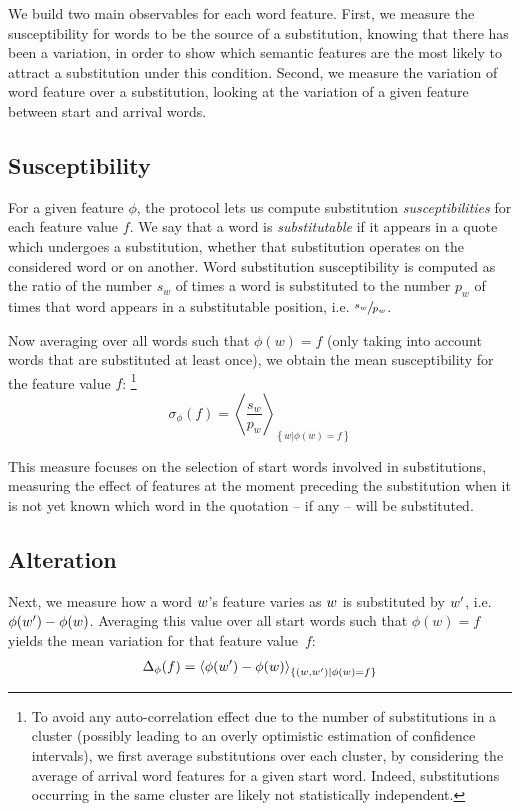 We build two main observables for each word feature.
First, we measure the susceptibility for words to be the source of a substitution, knowing that there has been a variation, in order to show which semantic features are the most likely to attract a substitution under this condition.
Second, we measure the variation of word feature over a substitution, looking at the variation of a given feature between start and arrival words.

\subsection{Susceptibility}

For a given feature $\phi$, the protocol lets us compute substitution \emph{susceptibilities} for each feature value $f$.
We say that a word is \emph{substitutable} if it appears in a quote which undergoes a substitution, whether that substitution operates on the considered word or on another.
Word substitution susceptibility is computed as the ratio of the number $s_w$ of times a word is substituted to the number $p_w$ of times that word appears in a substitutable position, i.e. $\sfrac{s_w}{p_w}$.

Now averaging over all words such that $\phi(w) = f$ (only taking into account words that are substituted at least once), we obtain the mean susceptibility for the feature value $f$:
\footnote{To avoid any auto-correlation effect due to the number of substitutions in a cluster (possibly leading to an overly optimistic estimation of confidence intervals), we first average substitutions over each cluster, by considering the average of arrival word features for a given start word.
Indeed, substitutions occurring in the same cluster are likely not statistically independent.}
$$\sigma_{\phi}(f) = \left< \frac{s_w}{p_w} \right>_{\left\lbrace w | \phi(w) = f \right\rbrace}$$

This measure focuses on the selection of start words involved in substitutions, measuring the effect of features at the moment preceding the substitution when it is not yet known which word in the quotation -- if any -- will be substituted.

\subsection{Alteration}

Next, we measure how a word $w$'s feature varies as $w$ is substituted by $w'$, i.e. $\phi(w') - \phi(w)$.
Averaging this value over all start words such that $\phi(w) = f$ yields the mean variation for that feature value~$f$:
$$\Delta_{\phi}(f) = \left< \phi(w') - \phi(w) \right>_{\left\lbrace (w,w') | \phi(w) = f \right\rbrace}$$

